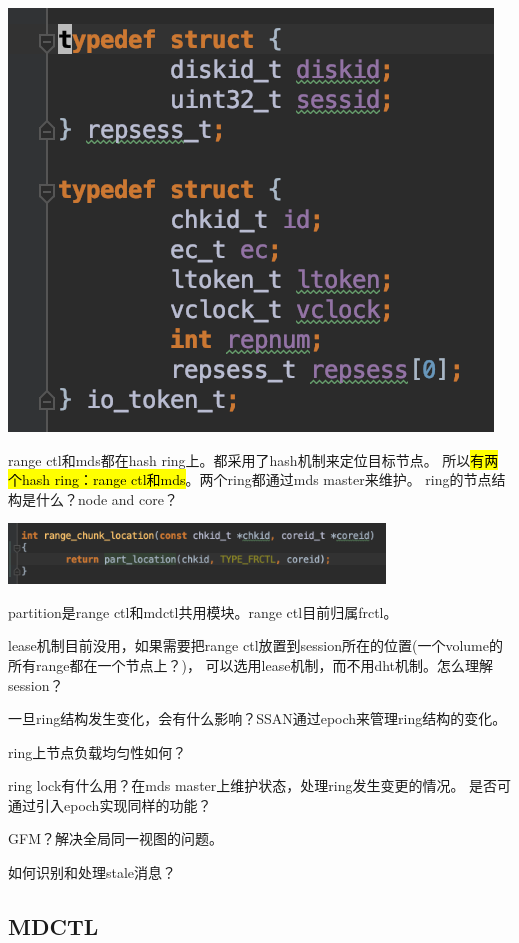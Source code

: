 \begin{center}
\includegraphics{../imgs/token.png}
\end{center}

range ctl和mds都在hash ring上。都采用了hash机制来定位目标节点。
所以\hl{有两个hash ring：range ctl和mds}。两个ring都通过mds master来维护。
ring的节点结构是什么？node and core？
\begin{center}
\includegraphics[width=10cm]{../imgs/chunk-location.png}
\end{center}

partition是range ctl和mdctl共用模块。range ctl目前归属frctl。

lease机制目前没用，如果需要把range ctl放置到session所在的位置(一个volume的所有range都在一个节点上？)，
可以选用lease机制，而不用dht机制。怎么理解session？

一旦ring结构发生变化，会有什么影响？SSAN通过epoch来管理ring结构的变化。

ring上节点负载均匀性如何？

ring lock有什么用？在mds master上维护状态，处理ring发生变更的情况。
是否可通过引入epoch实现同样的功能？

GFM？解决全局同一视图的问题。

如何识别和处理stale消息？

\subsection{MDCTL}

